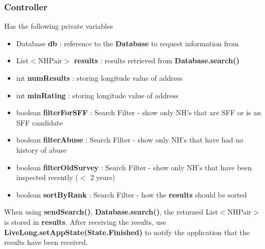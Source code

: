 \documentclass[12pt]{article}
\begin{document}
\subsubsection{Controller}
Has the following private variables
\begin{itemize}
\item Database \textbf{db} : reference to the \textbf{Database} to request information from
\item List$<$NHPair$>$ \textbf{results} : results retrieved from \textbf{Database.search()}
\item int \textbf{numResults} : storing longitude value of address
\item int \textbf{minRating} : storing longitude value of address
\item boolean \textbf{filterForSFF} : Search Filter - show only NH's that are SFF or is an SFF candidate
\item boolean \textbf{filterAbuse} : Search Filter - show only NH's that have had no history of abuse
\item boolean \textbf{filterOldSurvey} : Search Filter - show only NH's that have been inspected recently ($<$ 2 years)
\item boolean \textbf{sortByRank} : Search Filter - how the \textbf{results} should be sorted
\end{itemize}
When using \textbf{sendSearch()}, \textbf{Database.search()}, the returned  List$<$NHPair$>$ is stored in \textbf{results}. After receiving the results, use \textbf{LiveLong.setAppState(State.Finished)} to notify the application that the results have been received.


\newpage
\end{document}
